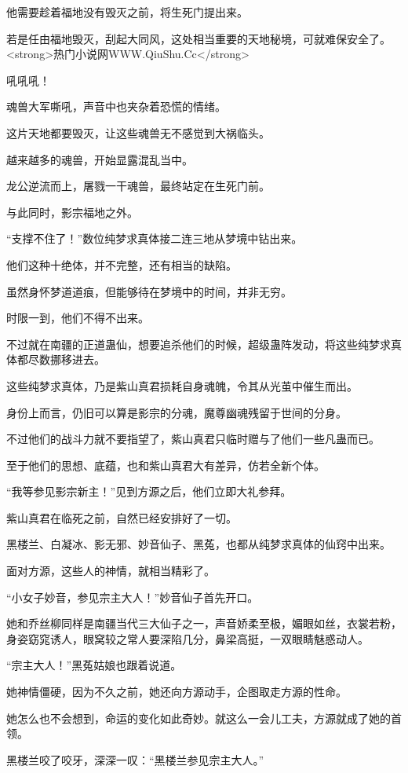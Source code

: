 \begin{this_body}
他需要趁着福地没有毁灭之前，将生死门提出来。

若是任由福地毁灭，刮起大同风，这处相当重要的天地秘境，可就难保安全了。<strong>热门小说网WWW.QiuShu.Cc</strong>

吼吼吼！

魂兽大军嘶吼，声音中也夹杂着恐慌的情绪。

这片天地都要毁灭，让这些魂兽无不感觉到大祸临头。

越来越多的魂兽，开始显露混乱当中。

龙公逆流而上，屠戮一干魂兽，最终站定在生死门前。

与此同时，影宗福地之外。

“支撑不住了！”数位纯梦求真体接二连三地从梦境中钻出来。

他们这种十绝体，并不完整，还有相当的缺陷。

虽然身怀梦道道痕，但能够待在梦境中的时间，并非无穷。

时限一到，他们不得不出来。

不过就在南疆的正道蛊仙，想要追杀他们的时候，超级蛊阵发动，将这些纯梦求真体都尽数挪移进去。

这些纯梦求真体，乃是紫山真君损耗自身魂魄，令其从光茧中催生而出。

身份上而言，仍旧可以算是影宗的分魂，魔尊幽魂残留于世间的分身。

不过他们的战斗力就不要指望了，紫山真君只临时赠与了他们一些凡蛊而已。

至于他们的思想、底蕴，也和紫山真君大有差异，仿若全新个体。

“我等参见影宗新主！”见到方源之后，他们立即大礼参拜。

紫山真君在临死之前，自然已经安排好了一切。

黑楼兰、白凝冰、影无邪、妙音仙子、黑菟，也都从纯梦求真体的仙窍中出来。

面对方源，这些人的神情，就相当精彩了。

“小女子妙音，参见宗主大人！”妙音仙子首先开口。

她和乔丝柳同样是南疆当代三大仙子之一，声音娇柔至极，媚眼如丝，衣裳若粉，身姿窈窕诱人，眼窝较之常人要深陷几分，鼻梁高挺，一双眼睛魅惑动人。

“宗主大人！”黑菟姑娘也跟着说道。

她神情僵硬，因为不久之前，她还向方源动手，企图取走方源的性命。

她怎么也不会想到，命运的变化如此奇妙。就这么一会儿工夫，方源就成了她的首领。

黑楼兰咬了咬牙，深深一叹：“黑楼兰参见宗主大人。”


\end{this_body}
